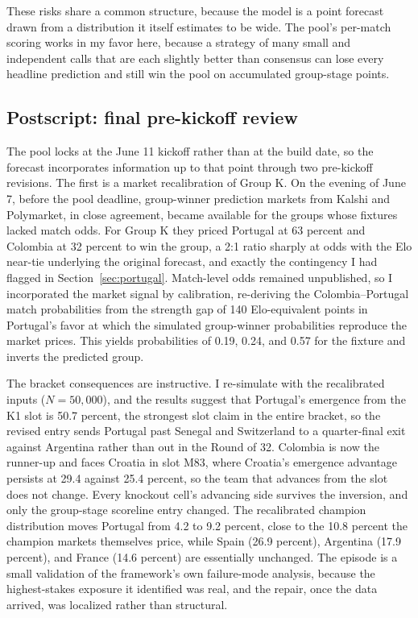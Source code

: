 \documentclass[11pt,letterpaper]{article}
\begin{document}
These risks share a common structure, because the model is a point forecast drawn from a distribution it itself estimates to be wide. The pool's per-match scoring works in my favor here, because a strategy of many small and independent calls that are each slightly better than consensus can lose every headline prediction and still win the pool on accumulated group-stage points.

\subsection{Postscript: final pre-kickoff review}\label{sec:postscript}

The pool locks at the June 11 kickoff rather than at the build date, so the forecast incorporates information up to that point through two pre-kickoff revisions. The first is a market recalibration of Group K. On the evening of June 7, before the pool deadline, group-winner prediction markets from Kalshi and Polymarket, in close agreement, became available for the groups whose fixtures lacked match odds. For Group K they priced Portugal at 63 percent and Colombia at 32 percent to win the group, a 2:1 ratio sharply at odds with the Elo near-tie underlying the original forecast, and exactly the contingency I had flagged in Section~\ref{sec:portugal}. Match-level odds remained unpublished, so I incorporated the market signal by calibration, re-deriving the Colombia--Portugal match probabilities from the strength gap of 140 Elo-equivalent points in Portugal's favor at which the simulated group-winner probabilities reproduce the market prices. This yields probabilities of 0.19, 0.24, and 0.57 for the fixture and inverts the predicted group.

The bracket consequences are instructive. I re-simulate with the recalibrated inputs ($N = 50{,}000$), and the results suggest that Portugal's emergence from the K1 slot is 50.7 percent, the strongest slot claim in the entire bracket, so the revised entry sends Portugal past Senegal and Switzerland to a quarter-final exit against Argentina rather than out in the Round of 32. Colombia is now the runner-up and faces Croatia in slot M83, where Croatia's emergence advantage persists at 29.4 against 25.4 percent, so the team that advances from the slot does not change. Every knockout cell's advancing side survives the inversion, and only the group-stage scoreline entry changed. The recalibrated champion distribution moves Portugal from 4.2 to 9.2 percent, close to the 10.8 percent the champion markets themselves price, while Spain (26.9 percent), Argentina (17.9 percent), and France (14.6 percent) are essentially unchanged. The episode is a small validation of the framework's own failure-mode analysis, because the highest-stakes exposure it identified was real, and the repair, once the data arrived, was localized rather than structural.
\end{document}
